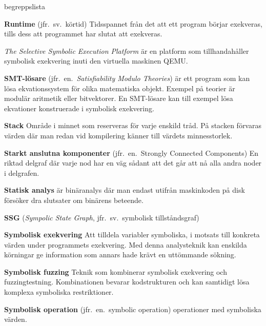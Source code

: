 \begin{labeling}{begreppslista}
    \item [\textbf{Runtime}] (jfr.\ sv.\ körtid) Tidsspannet från
    det att ett program börjar exekveras, tills dess att
    programmet har slutat att exekveras.

    \item [\textbf{\stoe}] \emph{The Selective Symbolic Execution Platform} är
    en platform som tillhandahåller symbolisk exekvering inuti den
    virtuella maskinen QEMU.\@

    \item [\textbf{SMT-lösare}] (jfr.\ en.\ \emph{Satisfiability Modulo
              Theories}) är ett program som kan lösa
    ekvationssystem för olika matematiska objekt. Exempel på
    teorier är modulär aritmetik eller bitvektorer. En SMT-lösare
    kan till exempel lösa ekvationer konstruerade i symbolisk
    exekvering.

    \item [\textbf{Stack}] Område i minnet som reserveras för varje
    enskild tråd.  På stacken förvaras värden där man redan vid
    kompilering känner till värdets minnesstorlek.

    \item [\textbf{Starkt anslutna komponenter}] (jfr.\ en.\ Strongly
          Connected Components) En riktad delgraf där varje nod har en
    väg sådant att det går att nå alla andra noder i delgrafen.

    \item [\textbf{Statisk analys}] är binäranalys där man endast
    utifrån maskinkoden på disk försöker dra slutsater om binärens
    beteende.

    \item [\textbf{SSG}] (\emph{Sympolic State Graph},
          jfr.\ sv.\ symbolisk tillståndsgraf)

    \item [\textbf{Symbolisk exekvering}] Att tilldela variabler
    symboliska, i motsats till konkreta värden under programmets
    exekvering. Med denna analysteknik kan enskilda körningar ge
    information som annars hade krävt en uttömmande sökning.

    \item [\textbf{Symbolisk fuzzing}] Teknik som kombinerar
    symbolisk exekvering och fuzzingtestning. Kombinationen
    bevarar kodstrukturen och kan samtidigt lösa komplexa
    symboliska restriktioner.

    \item [\textbf{Symbolisk operation}] (jfr.\ en.\ symbolic
          operation) operationer med symboliska värden.


\end{labeling}
